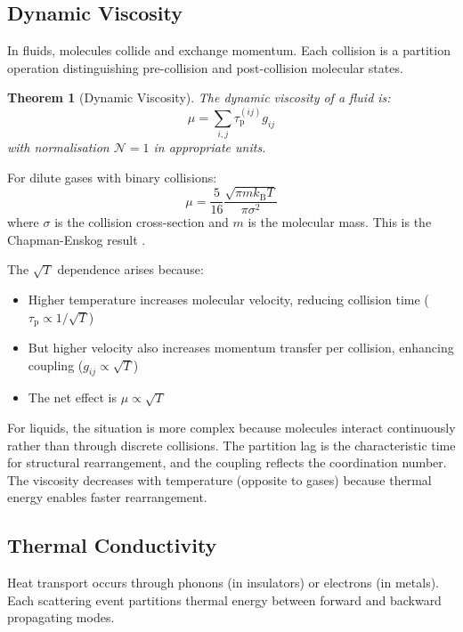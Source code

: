 \documentclass[twocolumn,10pt,aps,prd,superscriptaddress,nofootinbib]{revtex4-2}
\newtheorem{theorem}{Theorem}[section]
\theoremstyle{remark}
\newcommand{\kB}{k_{\mathrm{B}}}
\newcommand{\tauP}{\tau_{\mathrm{p}}}
\newcommand{\Gij}{g_{ij}}
\newcommand{\Norm}{\mathcal{N}}
\begin{document}
\subsection{Dynamic Viscosity}

In fluids, molecules collide and exchange momentum. Each collision is a partition operation distinguishing pre-collision and post-collision molecular states.

\begin{theorem}[Dynamic Viscosity]
\label{thm:viscosity}
The dynamic viscosity of a fluid is:
\begin{equation}
\mu = \sum_{i,j} \tauP^{(ij)} \Gij
\label{eq:viscosity}
\end{equation}
with normalisation $\Norm = 1$ in appropriate units.
\end{theorem}

For dilute gases with binary collisions:
\begin{equation}
\mu = \frac{5}{16} \frac{\sqrt{\pi m \kB T}}{\pi \sigma^2}
\label{eq:gas_viscosity}
\end{equation}
where $\sigma$ is the collision cross-section and $m$ is the molecular mass. This is the Chapman-Enskog result \cite{chapman1990}.

The $\sqrt{T}$ dependence arises because:
\begin{itemize}
\item Higher temperature increases molecular velocity, reducing collision time ($\tauP \propto 1/\sqrt{T}$)
\item But higher velocity also increases momentum transfer per collision, enhancing coupling ($\Gij \propto \sqrt{T}$)
\item The net effect is $\mu \propto \sqrt{T}$
\end{itemize}

For liquids, the situation is more complex because molecules interact continuously rather than through discrete collisions. The partition lag is the characteristic time for structural rearrangement, and the coupling reflects the coordination number. The viscosity decreases with temperature (opposite to gases) because thermal energy enables faster rearrangement.

\subsection{Thermal Conductivity}

Heat transport occurs through phonons (in insulators) or electrons (in metals). Each scattering event partitions thermal energy between forward and backward propagating modes.
\end{document}

